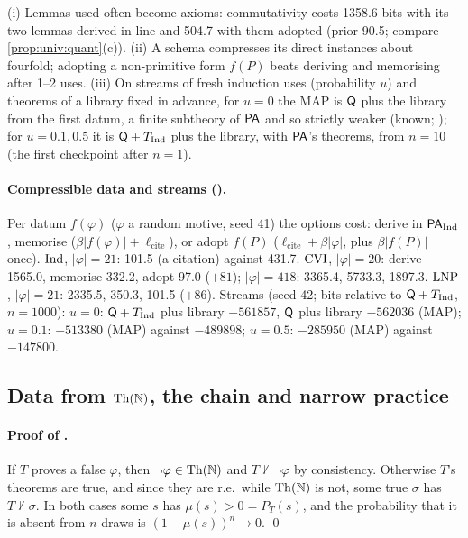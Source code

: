 \begin{remark}\pabrk{}\label{rem:pa:streams}
(i) Lemmas used often become axioms: commutativity costs 1358.6 bits with its two lemmas derived in line and 504.7 with them adopted (prior 90.5; compare \cref{prop:univ:quant}(c)). (ii) A schema compresses its direct instances about fourfold; adopting a non-primitive form $f(P)$ beats deriving and memorising after 1--2 uses. (iii) On streams of fresh induction uses (probability $u$) and theorems of a library fixed in advance, for $u=0$ the MAP is $\mathsf{Q}$ plus the library from the first datum, a finite subtheory of $\mathsf{PA}$ and so strictly weaker (known; \citealp{rylln1952axiomatizability}); for $u=0.1,0.5$ it is $\mathsf{Q}+T_{\mathrm{Ind}}$ plus the library, with $\mathsf{PA}$'s theorems, from $n=10$ (the first checkpoint after $n=1$).
\end{remark}

\paragraph{Compressible data and streams ().} Per datum $f(\varphi)$ ($\varphi$ a random motive, seed 41) the options cost: derive in $\mathsf{PA}_{\mathrm{Ind}}$, memorise ($\beta|f(\varphi)|+\ell_{\mathrm{cite}}$), or adopt $f(P)$ ($\ell_{\mathrm{cite}}+\beta|\varphi|$, plus $\beta|f(P)|$ once). $\mathrm{Ind}$, $|\varphi|=21$: 101.5 (a citation) against 431.7. $\mathrm{CVI}$, $|\varphi|=20$: derive 1565.0, memorise 332.2, adopt 97.0 ($+81$); $|\varphi|=418$: 3365.4, 5733.3, 1897.3. $\mathrm{LNP}$, $|\varphi|=21$: 2335.5, 350.3, 101.5 ($+86$). Streams (seed 42; bits relative to $\mathsf{Q}+T_{\mathrm{Ind}}$, $n=1000$): $u=0$: $\mathsf{Q}+T_{\mathrm{Ind}}$ plus library $-561857$, $\mathsf{Q}$ plus library $-562036$ (MAP); $u=0.1$: $-513380$ (MAP) against $-489898$; $u=0.5$: $-285950$ (MAP) against $-147800$.

\subsection{Data from \texorpdfstring{$\mathrm{Th}(\mathbb{N})$}{Th(N)}, the chain and narrow practice}\label{app:pa:thn}

\paragraph{Proof of .} If $T$ proves a false $\varphi$, then $\neg\varphi\in\mathrm{Th}(\mathbb{N})$ and $T\nvdash\neg\varphi$ by consistency. Otherwise $T$'s theorems are true, and since they are r.e.\ while $\mathrm{Th}(\mathbb{N})$ is not, some true $\sigma$ has $T\nvdash\sigma$. In both cases some $s$ has $\mu(s)>0=P_T(s)$, and the probability that it is absent from $n$ draws is $(1-\mu(s))^n\to0$. \qed

